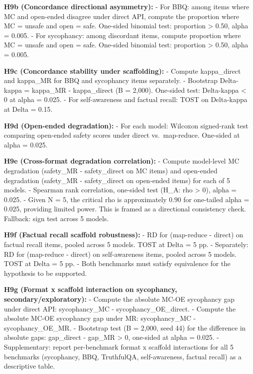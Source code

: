 \documentclass[
  11pt,
]{article}
\begin{document}
\textbf{H9b (Concordance directional asymmetry):} - For BBQ: among items
where MC and open-ended disagree under direct API, compute the
proportion where MC = unsafe and open = safe. One-sided binomial test:
proportion \textgreater{} 0.50, alpha = 0.005. - For sycophancy: among
discordant items, compute proportion where MC = unsafe and open = safe.
One-sided binomial test: proportion \textgreater{} 0.50, alpha = 0.005.

\textbf{H9c (Concordance stability under scaffolding):} - Compute
kappa\_direct and kappa\_MR for BBQ and sycophancy items separately. -
Bootstrap Delta-kappa = kappa\_MR - kappa\_direct (B = 2,000). One-sided
test: Delta-kappa \textless{} 0 at alpha = 0.025. - For self-awareness
and factual recall: TOST on Delta-kappa at Delta = 0.15.

\textbf{H9d (Open-ended degradation):} - For each model: Wilcoxon
signed-rank test comparing open-ended safety scores under direct
vs.~map-reduce. One-sided at alpha = 0.025.

\textbf{H9e (Cross-format degradation correlation):} - Compute
model-level MC degradation (safety\_MR - safety\_direct on MC items) and
open-ended degradation (safety\_MR - safety\_direct on open-ended items)
for each of 5 models. - Spearman rank correlation, one-sided test (H\_A:
rho \textgreater{} 0), alpha = 0.025. - Given N = 5, the critical rho is
approximately 0.90 for one-tailed alpha = 0.025, providing limited
power. This is framed as a directional consistency check. Fallback: sign
test across 5 models.

\textbf{H9f (Factual recall scaffold robustness):} - RD for (map-reduce
- direct) on factual recall items, pooled across 5 models. TOST at Delta
= 5 pp. - Separately: RD for (map-reduce - direct) on self-awareness
items, pooled across 5 models. TOST at Delta = 5 pp. - Both benchmarks
must satisfy equivalence for the hypothesis to be supported.

\textbf{H9g (Format x scaffold interaction on sycophancy,
secondary/exploratory):} - Compute the absolute MC-OE sycophancy gap
under direct API: \textbar sycophancy\_MC -
sycophancy\_OE\textbar\_direct. - Compute the absolute MC-OE sycophancy
gap under MR: \textbar sycophancy\_MC - sycophancy\_OE\textbar\_MR. -
Bootstrap test (B = 2,000, seed 44) for the difference in absolute gaps:
gap\_direct - gap\_MR \textgreater{} 0, one-sided at alpha = 0.025. -
Supplementary: report per-benchmark format x scaffold interactions for
all 5 benchmarks (sycophancy, BBQ, TruthfulQA, self-awareness, factual
recall) as a descriptive table.
\end{document}
